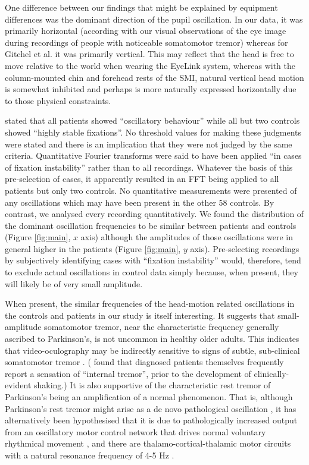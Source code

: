 \documentclass[jou,a4paper]{apa6}
\begin{document}
One difference between our findings that might be explained by equipment differences was the dominant direction of the pupil oscillation. In our data, it was primarily horizontal (according with our visual observations of the eye image during recordings of people with noticeable somatomotor tremor) whereas for Gitchel et al. it was primarily vertical. This may reflect that the head is free to move relative to the world when wearing the EyeLink system, whereas with the column-mounted chin and forehead rests of the SMI, natural vertical head motion is somewhat inhibited and perhaps is more naturally expressed horizontally due to those physical constraints.

\citet{Gitchel2012Pervasive-ocula} stated that all patients showed ``oscillatory behaviour'' while all but two controls showed ``highly stable fixations''. No threshold values for making these judgments were stated and there is an implication that they were not judged by the same criteria. Quantitative Fourier transforms were said to have been applied ``in cases of fixation instability'' rather than to all recordings. Whatever the basis of this pre-selection of cases, it apparently resulted in an FFT being applied to all patients but only two controls. No quantitative measurements were presented of any oscillations which may have been present in the other 58 controls. By contrast, we analysed every recording quantitatively. We found the distribution of the dominant oscillation frequencies to be similar between patients and controls (Figure \ref{fig:main}, $x$ axis) although the amplitudes of those oscillations were in general higher in the patients (Figure \ref{fig:main}, $y$ axis). Pre-selecting recordings by subjectively identifying cases with ``fixation instability'' would, therefore, tend to exclude actual oscillations in control data simply because, when present, they will likely be of very small amplitude.

When present, the similar frequencies of the head-motion related oscillations in the controls and patients in our study is itself interesting. It suggests that small-amplitude somatomotor tremor, near the characteristic frequency generally ascribed to Parkinson's, is not uncommon in healthy older adults. This indicates that video-oculography may be indirectly sensitive to signs of subtle, sub-clinical somatomotor tremor \citep{MacAskill2013Ocular-Tremor-i}.  (\citet{Shulman1996Internal-tremor} found that diagnosed patients themselves frequently report a sensation of ``internal tremor'', prior to the development of clinically-evident shaking.)  It is also supportive of the characteristic rest tremor of Parkinson's being an amplification of a normal phenomenon. That is, although Parkinson's rest tremor might arise as a de novo pathological oscillation \citep{McAuley2000Physiological-a}, it has alternatively been hypothesised that it is due to pathologically increased output from an oscillatory motor control network that drives normal voluntary rhythmical movement \citep{Burkhard:NeurophysiolClin:2002,Schnitzler2005Normal-and-path,Schnitzler2006Physiological-a}, and there are thalamo-cortical-thalamic motor circuits with a natural resonance frequency of 4-5 Hz \citep{Volkmann:Neurology:1996}.
\end{document}
